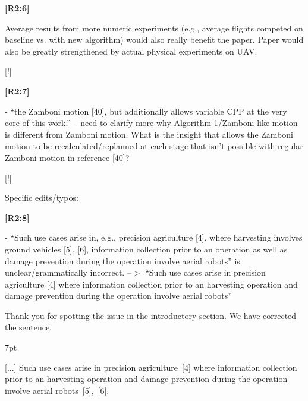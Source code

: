 \documentclass[10pt]{letter}
\newenvironment{formal}{%
  \def\FrameCommand{%
    \hspace{1pt}%
    {\color{red}\vrule width 2pt}%
    {\color{formalshade}\vrule width 4pt}%
    \colorbox{formalshade}%
  }%
  \MakeFramed{\advance\hsize-\width\FrameRestore}%
  \noindent\hspace{-4.55pt}%
  \begin{adjustwidth}{}{7pt}%
  \vspace{2pt}\vspace{2pt}%
}
{%
  \vspace{2pt}\end{adjustwidth}\endMakeFramed%
}
\begin{document}
  {\hspace*{-4.5em}\textbf{[R2:6]}\vspace*{-1.9em}}

  Average results from more numeric experiments (e.g., average flights competed on baseline vs. with new algorithm) would also really benefit the paper. Paper would also be greatly strengthened by actual physical experiments on UAV.
  
  {\color{blue} 
  
  {\hspace*{-4.5em}{[R2:6]}\vspace*{-1.9em}}
  
  [!]}

{\hspace*{-4.5em}\textbf{[R2:7]}\vspace*{-1.9em}}

- ``the Zamboni motion [40], but additionally allows variable CPP at the very core of this work.'' -- need to clarify more why Algorithm 1/Zamboni-like motion is different from Zamboni motion. What is the   insight that allows the Zamboni motion to be recalculated/replanned at each stage that isn't possible with regular Zamboni motion in reference [40]? 

{\color{blue} 
  
{\hspace*{-4.5em}{[R2:7]}\vspace*{-1.9em}}
  
[!]}


\vspace{2em}

Specific edits/typos: 

{\hspace*{-4.5em}\textbf{[R2:8]}\vspace*{-1.9em}}

- ``Such use cases arise in, e.g., precision agriculture [4], where harvesting involves ground vehicles [5], [6], information collection prior to an operation as well as damage prevention during the operation involve aerial robots'' is unclear/grammatically incorrect. --$>$	``Such use cases arise in precision agriculture [4] where information collection prior to an harvesting operation and damage prevention during the operation involve aerial robots''
  
{\color{blue}

{\hspace*{-4.5em}{[R2:8]}\vspace*{-1.9em}}

Thank you for spotting the issue in the introductory section. We have corrected the sentence.

\begin{formal}
  \color{black} [...] Such use cases arise in precision agriculture~[{\color{green}4}] where {\color{blue}information collection prior to an harvesting operation and} damage prevention during the operation involve aerial robots~[{\color{green}5}],~[{\color{green}6}].

  \vspace*{1ex}
\end{formal}

}
\end{document}
